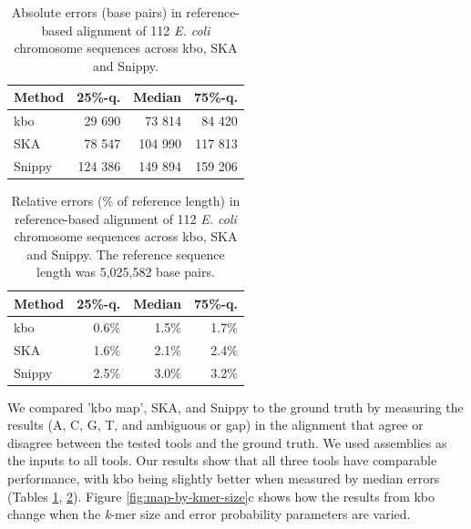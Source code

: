 \documentclass[unnumsec,webpdf,contemporary,large]{oup-authoring-template}%
\theoremstyle{thmstyleone}%
\theoremstyle{thmstyletwo}%
\theoremstyle{thmstylethree}%
\newcommand{\kbo}{{\sf kbo}}
\begin{document}
\begin{table}[]
\centering
\begin{tabular}{lrrr}
Method & 25\%-q.  & Median  & 75\%-q. \\
\hline
\kbo    & 29 690 & 73 814   & 84 420  \\
SKA    & 78 547 & 104 990 & 117 813 \\
Snippy  & 124 386 & 149 894 & 159 206  \\
\end{tabular}
\caption{Absolute errors (base pairs) in reference-based alignment of 112 \textit{E. coli} chromosome sequences across \kbo, SKA and Snippy.}
\label{map-absolute-error}
\end{table}
\begin{table}[]
\centering
\begin{tabular}{lrrr}
Method & 25\%-q.  & Median  & 75\%-q. \\
\hline
\kbo    & 0.6\% & 1.5\% & 1.7\%  \\
SKA    & 1.6\% & 2.1\% & 2.4\% \\
Snippy  & 2.5\% & 3.0\%   & 3.2\%  \\
\end{tabular}
\caption{Relative errors (\% of reference length) in reference-based alignment of 112 \textit{E. coli} chromosome sequences across \kbo, SKA and Snippy. The reference sequence length was 5,025,582 base pairs.}
\label{map-relative-error}
\end{table}

We compared 'kbo map', SKA\cite{derelle2024seamless}, and Snippy\cite{seemann2015snippy} to the ground truth by measuring the results (A, C, G, T, and ambiguous or gap) in the alignment that agree or disagree between the tested tools and the ground truth. We used assemblies as the inputs to all tools. Our results show that all three tools have comparable performance, with {\sf kbo} being slightly better when measured by median errors (Tables \ref{map-absolute-error}, \ref{map-relative-error}). Figure \ref{fig:map-by-kmer-size}c shows how the results from {\sf kbo} change when the \emph{k}-mer size and error probability parameters are varied.
\end{document}
